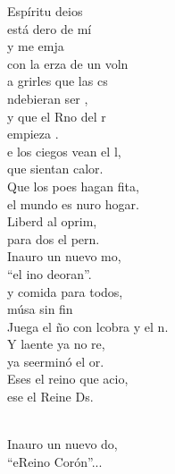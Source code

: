 \documentclass[12pt]{article}
\begin{document}
\begin{multicols*}{2}
\begin{cancion}%
	 Espíritu deios\\
	está dero de mí\\
	y me emja\\
	con la erza de un voln\\
	a grirles que las cs\\
	ndebieran ser , \\
	y que el Rno del r\\
	empieza .\\
\jump
	e los ciegos vean el l,\\
	que sientan  calor.\\
	Que los poes hagan fita,\\
	el mundo es nuro hogar.\\
	Liberd al oprim,\\
	para dos el pern.\\
	Inauro un nuevo mo,\\
	“el ino deoran”. \\
\jump
	y comida para todos,\\
	músa sin fin\\
	Juega el ño con lcobra y el n. \\
	Y laente ya no re,\\
	ya seerminó el or.\\
	Eses el reino que acio,\\
	ese  el Reine Ds.\\\jump\\
	\begin{chorus}%
	Inauro un nuevo do,\\
	“eReino  Corón”...\\
	\end{chorus}%
	\jump\\
\end{cancion}%


\end{multicols*}
\end{document}
